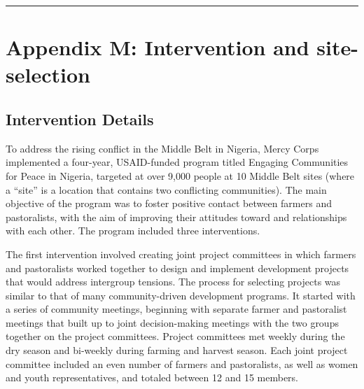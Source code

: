 \documentclass[
]{article}
\begin{document}
\begin{center}\rule{0.5\linewidth}{0.5pt}\end{center}

\newpage

\hypertarget{appendix-m-intervention-and-site-selection}{%
\section{Appendix M: Intervention and
site-selection}\label{appendix-m-intervention-and-site-selection}}

\hypertarget{intervention-details}{%
\subsection{Intervention Details}\label{intervention-details}}

To address the rising conflict in the Middle Belt in Nigeria, Mercy
Corps implemented a four-year, USAID-funded program titled Engaging
Communities for Peace in Nigeria, targeted at over 9,000 people at 10
Middle Belt sites (where a ``site'' is a location that contains two
conflicting communities). The main objective of the program was to
foster positive contact between farmers and pastoralists, with the aim
of improving their attitudes toward and relationships with each other.
The program included three interventions.

The first intervention involved creating joint project committees in
which farmers and pastoralists worked together to design and implement
development projects that would address intergroup tensions. The process
for selecting projects was similar to that of many community-driven
development programs. It started with a series of community meetings,
beginning with separate farmer and pastoralist meetings that built up to
joint decision-making meetings with the two groups together on the
project committees. Project committees met weekly during the dry season
and bi-weekly during farming and harvest season. Each joint project
committee included an even number of farmers and pastoralists, as well
as women and youth representatives, and totaled between 12 and 15
members.
\end{document}
